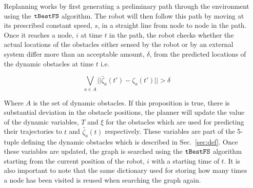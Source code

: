 Replanning works by first generating a preliminary path through the environment
using the $\Acronym{tBestFS}$ algorithm. The robot will then follow this path
by moving at its prescribed constant speed, $s$, in a straight line from node
to node in the path. Once it reaches a node, $i$ at time $t$ in the path, the
robot checks whether the actual locations of the obstacles either sensed by the
robot or by an external system differ more than an acceptable amount, $\delta$,
from the predicted locations of the dynamic obstacles at time $t$ i.e.

$$\bigvee_{a \in A} ||\tilde{\zeta_a}(t') - \zeta_a(t')|| > \delta$$

Where $A$ is the set of dynamic obstacles. If this proposition is true, there
is substantial deviation in the obstacle positions, the planner will update the
value of the dynamic variables, $T$ and $\xi$ for the obstacles which are used
for predicting their trajectories to $t$ and $\tilde{\zeta_a}(t)$ respectively.
These variables are part of the 5-tuple defining the dynamic obstacles which is
described in Sec.~\ref{sec:def}. Once these variables are updated, the graph is
searched using the $\Acronym{tBestFS}$ algorithm starting from the current
position of the robot, $i$ with a starting time of $t$. It is also important to
note that the same dictionary used for storing how many times a node has been
visited is reused when searching the graph again.

